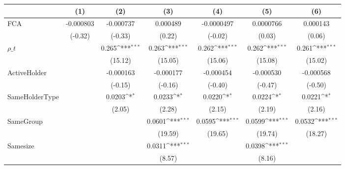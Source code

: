 {
\def\sym#1{\ifmmode^{#1}\else\(^{#1}\)\fi}
\begin{tabular}{l*{6}{c}}
\hline\hline
                    &\multicolumn{1}{c}{(1)}         &\multicolumn{1}{c}{(2)}         &\multicolumn{1}{c}{(3)}         &\multicolumn{1}{c}{(4)}         &\multicolumn{1}{c}{(5)}         &\multicolumn{1}{c}{(6)}         \\
\hline
 FCA                &   -0.000803         &   -0.000737         &    0.000489         &  -0.0000497         &   0.0000766         &    0.000143         \\
                    &     (-0.32)         &     (-0.33)         &      (0.22)         &     (-0.02)         &      (0.03)         &      (0.06)         \\
[1em]
$ \rho\_t $          &                     &       0.265\sym{***}&       0.263\sym{***}&       0.262\sym{***}&       0.262\sym{***}&       0.261\sym{***}\\
                    &                     &     (15.12)         &     (15.05)         &     (15.06)         &     (15.08)         &     (15.02)         \\
[1em]
ActiveHolder        &                     &   -0.000163         &   -0.000177         &   -0.000454         &   -0.000530         &   -0.000568         \\
                    &                     &     (-0.15)         &     (-0.16)         &     (-0.40)         &     (-0.47)         &     (-0.50)         \\
[1em]
SameHolderType      &                     &      0.0203\sym{*}  &      0.0233\sym{*}  &      0.0220\sym{*}  &      0.0224\sym{*}  &      0.0221\sym{*}  \\
                    &                     &      (2.05)         &      (2.28)         &      (2.15)         &      (2.19)         &      (2.16)         \\
[1em]
SameGroup           &                     &                     &      0.0601\sym{***}&      0.0595\sym{***}&      0.0599\sym{***}&      0.0532\sym{***}\\
                    &                     &                     &     (19.59)         &     (19.65)         &     (19.74)         &     (18.27)         \\
[1em]
Samesize            &                     &                     &      0.0311\sym{***}&                     &      0.0398\sym{***}&                     \\
                    &                     &                     &      (8.57)         &                     &      (8.16)         &                     \\

\end{tabular}}
